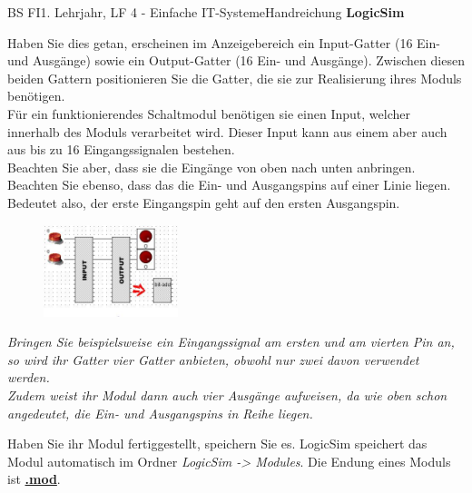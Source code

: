 \documentclass[11pt,oneside,openany,headings=optiontotoc,11pt,numbers=noenddot]{article}
\begin{document}
\begin{worksheet}{BS FI}{1. Lehrjahr, LF 4 - Einfache IT-Systeme}{Handreichung \textbf{LogicSim}}
\begin{figure}
		\end{figure}
		Haben Sie dies getan, erscheinen im Anzeigebereich ein Input-Gatter (16 Ein- und Ausgänge)  sowie ein Output-Gatter (16 Ein- und Ausgänge). Zwischen diesen beiden Gattern positionieren Sie die Gatter, die sie zur Realisierung ihres Moduls benötigen.\\
		Für ein funktionierendes Schaltmodul benötigen sie einen Input, welcher innerhalb des Moduls verarbeitet wird. Dieser Input kann aus einem aber auch aus bis zu 16 Eingangssignalen bestehen.\\
		Beachten Sie aber, dass sie die Eingänge von oben nach unten anbringen.\\
		Beachten Sie ebenso, dass das die Ein- und Ausgangspins auf einer Linie liegen. Bedeutet also, der erste Eingangspin geht auf den ersten Ausgangspin.\\
		\par\noindent
		\begin{figure}
			\vspace{-25pt}
			\includegraphics[width=0.35\textwidth]{../99_Bilder/falseInOut.jpg}
		\end{figure}
		\small{\textit{Bringen Sie beispielsweise ein Eingangssignal am ersten und am vierten Pin an, so wird ihr Gatter vier Gatter anbieten, obwohl nur zwei davon verwendet werden.\\
		Zudem weist ihr Modul dann auch vier Ausgänge aufweisen, da wie oben schon angedeutet, die Ein- und Ausgangspins in Reihe liegen.}}\\
		\par\noindent
		Haben Sie ihr Modul fertiggestellt, speichern Sie es. LogicSim speichert das Modul automatisch im Ordner \textit{LogicSim -> Modules}. Die Endung eines Moduls ist \textbf{\underline{.mod}}.

\end{worksheet}
\end{document}
